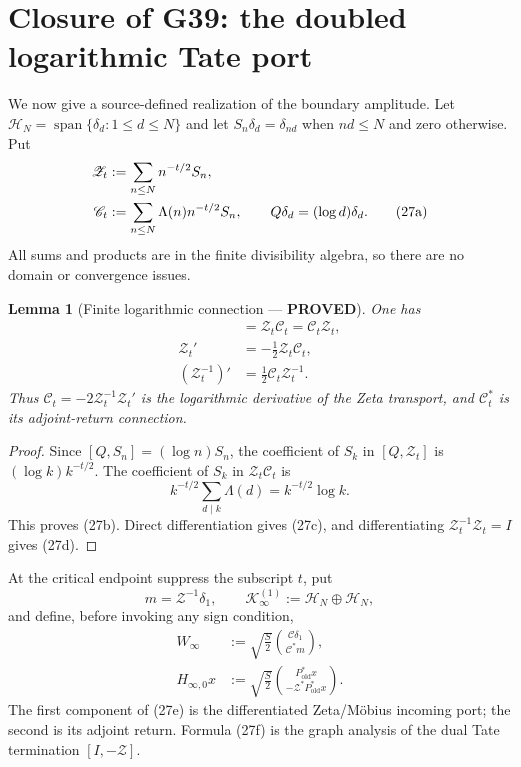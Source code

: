 \documentclass[11pt]{article}
\newtheorem{lemma}[theorem]{Lemma}
\newcommand{\PROVED}{\textcolor{green!45!black}{\textbf{PROVED}}}
\newcommand{\old}{\mathrm{old}}
\newcommand{\cC}{\mathscr C}
\newcommand{\cZ}{\mathscr Z}
\begin{document}
\section{Closure of G39: the doubled logarithmic Tate port}

We now give a source-defined realization of the boundary amplitude.  Let
$\mathcal H_N=\operatorname{span}\{\delta_d:1\le d\le N\}$ and let
$S_n\delta_d=\delta_{nd}$ when $nd\le N$ and zero otherwise.  Put
\begin{align}
 \cZ_t&:=\sum_{n\le N}n^{-t/2}S_n,\notag\\
 \cC_t&:=\sum_{n\le N}\Lambda(n)n^{-t/2}S_n,
 \qquad Q\delta_d=(\log d)\delta_d.                     \tag{27a}
\end{align}
All sums and products are in the finite divisibility algebra, so there are no
domain or convergence issues.

\begin{lemma}[Finite logarithmic connection --- \PROVED]
One has
\begin{align}
 [Q,\cZ_t]&=\cZ_t\cC_t=\cC_t\cZ_t,                    \tag{27b}\\
 \cZ_t'&=-\frac12\cZ_t\cC_t,                           \tag{27c}\\
 (\cZ_t^{-1})'&=\frac12\cC_t\cZ_t^{-1}.                \tag{27d}
\end{align}
Thus $\cC_t=-2\cZ_t^{-1}\cZ_t'$ is the logarithmic
derivative of the Zeta transport, and $\cC_t^*$ is its adjoint-return
connection.
\end{lemma}

\begin{proof}
Since $[Q,S_n]=(\log n)S_n$, the coefficient of $S_k$ in
$[Q,\cZ_t]$ is $(\log k)k^{-t/2}$.  The coefficient of $S_k$ in
$\cZ_t\cC_t$ is
\[
 k^{-t/2}\sum_{d\mid k}\Lambda(d)
 =k^{-t/2}\log k.
\]
This proves (27b).  Direct differentiation gives (27c), and differentiating
$\cZ_t^{-1}\cZ_t=I$ gives (27d).
\end{proof}

At the critical endpoint suppress the subscript $t$, put
\[
 m=\cZ^{-1}\delta_1,\qquad
 \mathcal K_\infty^{(1)}:=\mathcal H_N\oplus\mathcal H_N,
\]
and define, before invoking any sign condition,
\begin{align}
 W_\infty
 &:=\sqrt{\frac S2}
 \binom{\cC\delta_1}{\cC^*m},                           \tag{27e}\\
 H_{\infty,0}x
 &:=\sqrt{\frac S2}
 \binom{P_{\old}^*x}{-\cZ^*P_{\old}^*x}.              \tag{27f}
\end{align}
The first component of (27e) is the differentiated Zeta/Möbius incoming
port; the second is its adjoint return.  Formula (27f) is the graph analysis
of the dual Tate termination $[I,-\cZ]$.
\end{document}
